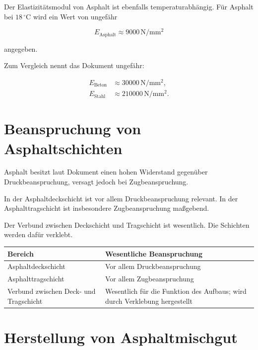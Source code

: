 \documentclass[
  12pt,
  a4paper,
  oneside
]{scrreprt}
\begin{document}
Der Elastizitätsmodul von Asphalt ist ebenfalls temperaturabhängig. Für
Asphalt bei $18\,^\circ\mathrm{C}$ wird ein Wert von ungefähr

\begin{equation}
  E_{\mathrm{Asphalt}}
  \approx
  9000\,\mathrm{N/mm^2}
\end{equation}

angegeben.


Zum Vergleich nennt das Dokument ungefähr:

\begin{align}
  E_{\mathrm{Beton}}
  &\approx
  30000\,\mathrm{N/mm^2}, \\
  E_{\mathrm{Stahl}}
  &\approx
  210000\,\mathrm{N/mm^2}.
\end{align}



\section{Beanspruchung von Asphaltschichten}

Asphalt besitzt laut Dokument einen hohen Widerstand gegenüber
Druckbeanspruchung, versagt jedoch bei Zugbeanspruchung.


In der Asphaltdeckschicht ist vor allem Druckbeanspruchung relevant.
In der Asphalttragschicht ist insbesondere Zugbeanspruchung
maßgebend.


Der Verbund zwischen Deckschicht und Tragschicht ist wesentlich. Die
Schichten werden dafür verklebt.


\begin{longtable}{
  >{\raggedright\arraybackslash}p{}
  >{\raggedright\arraybackslash}p{}
}
\toprule
\textbf{Bereich} &
\textbf{Wesentliche Beanspruchung} \\
\midrule
\endhead

Asphaltdeckschicht &
Vor allem Druckbeanspruchung \\

Asphalttragschicht &
Vor allem Zugbeanspruchung \\

Verbund zwischen Deck- und Tragschicht &
Wesentlich für die Funktion des Aufbaus; wird durch Verklebung
hergestellt \\

\bottomrule
\end{longtable}



\section{Herstellung von Asphaltmischgut}
\end{document}
